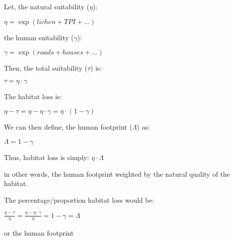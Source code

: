 Let, the natural suitability ($\eta$):

$\eta = \exp(lichen + TPI + ...)$ 

the human suitability ($\gamma$):

$\gamma = \exp(roads + houses + ...)$ 

Then, the total suitability ($\tau$) is:

$\tau = \eta \cdot \gamma$

The habitat loss is: 

$\eta - \tau = \eta - \eta \cdot \gamma = \eta \cdot (1-\gamma)$

We can then define, the human footprint ($\Lambda$) as:

$\Lambda = 1-\gamma$

Thus, habitat loss is simply: $\eta \cdot \Lambda$

in other words, the human footprint weighted by the natural quality of the habitat.

The percentage/proportion habitat loss would be:

$\frac{\eta - \tau}{\eta} = \frac{\eta - \eta \cdot \gamma}{\eta} = 1-\gamma = \Lambda$

or the human footprint














